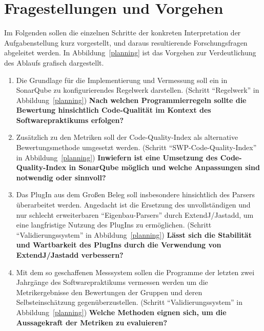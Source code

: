 \documentclass[da,ngerman]{stthesis}
\begin{document}
  		\section{Fragestellungen und Vorgehen}
  			Im Folgenden sollen die einzelnen Schritte der konkreten Interpretation der Aufgabenstellung kurz vorgestellt, und daraus resultierende Forschungsfragen abgeleitet werden. In Abbildung~\ref{planning} ist das Vorgehen zur Verdeutlichung des Ablaufs grafisch dargestellt.
  			\begin{enumerate}
				\item Die Grundlage für die Implementierung und Vermessung soll ein in SonarQube zu konfigurierendes Regelwerk darstellen. (Schritt "`Regelwerk"' in Abbildung~\ref{planning})\newline \newline
				\textbf{Nach welchen Programmierregeln sollte die Bewertung hinsichtlich Code-Qualität im Kontext des Softwarepraktikums erfolgen?}
				\item Zusätzlich zu den Metriken soll der Code-Quality-Index als alternative Bewertungsmethode umgesetzt werden. (Schritt "`SWP-Code-Quality-Index"' in Abbildung~\ref{planning})\newline \newline
				\textbf{Inwiefern ist eine Umsetzung des Code-Quality-Index in SonarQube möglich und welche Anpassungen sind notwendig oder sinnvoll?}
				\item Das PlugIn aus dem Großen Beleg soll insbesondere hinsichtlich des Parsers überarbeitet werden. Angedacht ist die Ersetzung des unvollständigen und nur schlecht erweiterbaren "`Eigenbau-Parsers"' durch ExtendJ/Jastadd, um eine langfristige Nutzung des PlugIns zu ermöglichen. (Schritt "`Validierungssystem"' in Abbildung~\ref{planning})\newline \newline
				\textbf{Lässt sich die Stabilität und Wartbarkeit des PlugIns durch die Verwendung von ExtendJ/Jastadd verbessern?}
				\item Mit dem so geschaffenen Messsystem sollen die Programme der letzten zwei Jahrgänge des Softwarepraktikums vermessen werden um die Metrikergebnisse den Bewertungen der Gruppen und deren Selbsteinschätzung gegenüberzustellen. \newline
				(Schritt "`Validierungssystem"' in Abbildung~\ref{planning})\newline \newline
				\textbf{Welche Methoden eignen sich, um die Aussagekraft der Metriken zu evaluieren?}

\end{enumerate}
\end{document}
